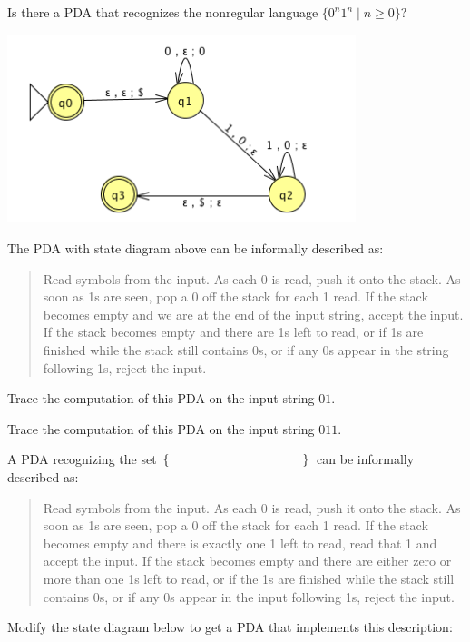 \documentclass[12pt, oneside]{article}
\begin{document}
\vfill

\vfill

Is there a PDA that recognizes the nonregular language $\{0^n1^n \mid n \geq 0 \}$?

\vfill

\newpage


\includegraphics[width=4in]{../../resources/machines/Lect9PDA.png}

The PDA with state diagram above can be informally described as:
\begin{quote}
    Read symbols from the input. As each 0 is read, push it onto the stack. 
    As soon as 1s are seen, pop a 0 off the stack for each 1 read. 
    If the stack becomes empty and we are at the end of the input string, accept the input. 
    If the stack becomes empty and there are 1s left to read, 
    or if 1s are finished while the stack still contains 0s, or if any 0s
    appear in the string following 1s, 
    reject the input.
\end{quote}
    

Trace the computation of this PDA on the input string $01$.

\vfill
    
Trace the computation of this PDA on the input string $011$.

\vfill


A PDA recognizing the set $\{ \hspace{1.5 in} \}$ can be informally described as:
\begin{quote}
    Read symbols from the input. As each 0 is read, push it onto the stack. 
    As soon as 1s are seen, pop a 0 off the stack for each 1 read. 
    If the stack becomes empty and there is exactly one 1 left to read, read that 1 and accept the input. 
    If the stack becomes empty and there are either zero or more than one 1s left to read, 
    or if the 1s are finished while the stack still contains 0s, or if any 0s appear in the input following 1s, 
    reject the input.
\end{quote}
Modify the state diagram below to get a PDA that implements this description:
\end{document}
